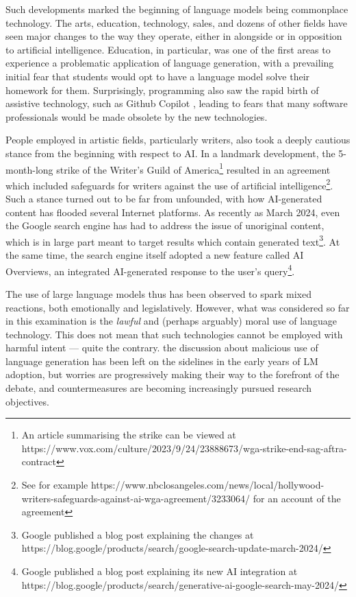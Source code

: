 Such developments marked the beginning of language models being commonplace technology.
The arts, education, technology, sales, and dozens of other fields have seen major changes to the way they operate, either in alongside or in opposition to artificial intelligence.
Education, in particular, was one of the first areas to experience a problematic application of language generation, with a prevailing initial fear that students would opt to have a language model solve their homework for them.
Surprisingly, programming also saw the rapid birth of assistive technology, such as Github Copilot \citep{chen2021evaluatinglargelanguagemodels}, leading to fears that many software professionals would be made obsolete by the new technologies.

People employed in artistic fields, particularly writers, also took a deeply cautious stance from the beginning with respect to AI.
In a landmark development, the 5-month-long strike of the Writer's Guild of America\footnote{An article summarising the strike can be viewed at https://www.vox.com/culture/2023/9/24/23888673/wga-strike-end-sag-aftra-contract}
resulted in an agreement which included safeguards for writers against the use of artificial intelligence\footnote{See for example https://www.nbclosangeles.com/news/local/hollywood-writers-safeguards-against-ai-wga-agreement/3233064/ for an account of the agreement}.
Such a stance turned out to be far from unfounded, with how AI-generated content has flooded several Internet platforms.
As recently as March 2024, even the Google search engine has had to address the issue of unoriginal content, which is in large part meant to target results which contain generated text\footnote{Google published a blog post explaining the changes at https://blog.google/products/search/google-search-update-march-2024/}.
At the same time, the search engine itself adopted a new feature called AI Overviews, an integrated AI-generated response to the user's query\footnote{Google published a blog post explaining its new AI integration at https://blog.google/products/search/generative-ai-google-search-may-2024/}.

The use of large language models thus has been observed to spark mixed reactions, both emotionally and legislatively. However, what was considered so far in this examination is the \emph{lawful} and (perhaps arguably) moral use of language technology.
This does not mean that such technologies cannot be employed with harmful intent --- quite the contrary. the discussion about malicious use of language generation has been left on the sidelines in the early years of LM adoption, but worries are progressively making their way to the forefront of the debate, and countermeasures are becoming increasingly pursued research objectives.